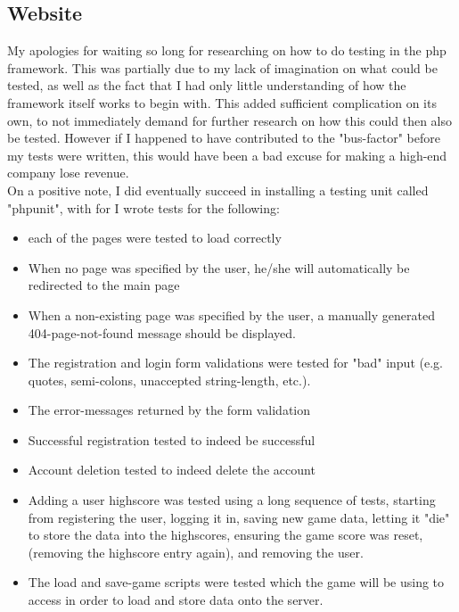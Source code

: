 \documentclass[12pt]{report}
\begin{document}
\subsection*{Website}
My apologies for waiting so long for researching on how to do testing in the php framework. This was partially due to my lack of imagination on what could be tested, as well as the fact that I had only little understanding of how the framework itself works to begin with. This added sufficient complication on its own, to not immediately demand for further research on how this could then also be tested. However if I happened to have contributed to the "bus-factor" before my tests were written, this would have been a bad excuse for making a high-end company lose revenue.\\
On a positive note, I did eventually succeed in installing a testing unit called "phpunit", with for I wrote tests for the following:
\begin{itemize}
\item each of the pages were tested to load correctly
\item When no page was specified by the user, he/she will automatically be redirected to the main page
\item When a non-existing page was specified by the user, a manually generated 404-page-not-found message should be displayed.
\item The registration and login form validations were tested for "bad" input (e.g. quotes, semi-colons, unaccepted string-length, etc.).
\item The error-messages returned by the form validation
\item Successful registration tested to indeed be successful
\item Account deletion tested to indeed delete the account
\item Adding a user highscore was tested using a long sequence of tests, starting from registering the user, logging it in, saving new game data, letting it "die" to store the data into the highscores, ensuring the game score was reset, (removing the highscore entry again), and removing the user.
\item The load and save-game scripts were tested which the game will be using to access in order to load and store data onto the server.
\end{itemize}
\end{document}

